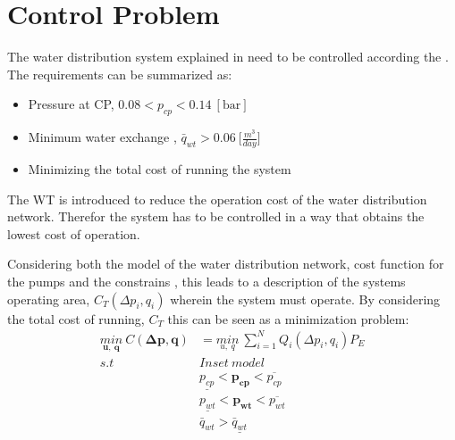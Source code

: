 \section{Control Problem}
\label{control_problem}

The water distribution system explained in  need to be controlled according the . The requirements can be summarized as: 

\begin{itemize}
	\item Pressure at CP, $0.08 < p_{cp} < 0.14 \:[\text{bar}]$
%
	\item Minimum water exchange , $\bar{q}_{wt} > 0.06 \: \big[\frac{m^3}{day}\big]$
%
	\item Minimizing the total cost of running the system
\end{itemize}

The WT is introduced to reduce the operation cost of the water distribution network. Therefor the system has to be controlled in a way that obtains the lowest cost of operation. 

Considering both the model of the water distribution network, cost function for the pumps and the constrains , this leads to a description of the systems operating area, $C_T(\Delta{p}_i,q_i)$ wherein the system must operate. By considering the total cost of running, $C_T$ this can be seen as a minimization problem:
\begin{align*}
\underset{\pmb{u}, \:\pmb{q}}{min} \: C(\pmb{\Delta{p}},\pmb{q}) &= \underset{u, \:q}{min} \: \sum_{i=1}^{N} Q_i(\Delta{p}_i,q_i) P_E  \\
%
s.t \:\:\:\:\: & Inset \:model \\
%
& \underline{p_{cp}} < \pmb{p_{cp}} < \overline{p_{cp}} \\
%
& \underline{p_{wt}} < \pmb{p_{wt}} < \overline{p_{wt}} \\
%
& \bar{q}_{wt} > \underline{\bar{q}_{wt}}
\end{align*}

